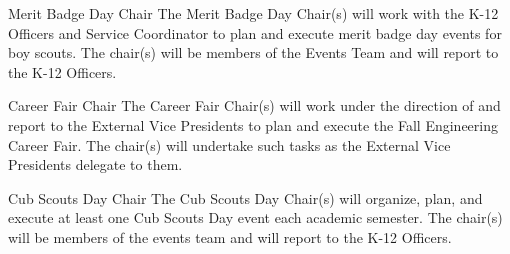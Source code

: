 \begin{enumsubsection}



\item{Merit Badge Day Chair}
The Merit Badge Day Chair(s) will work with the K-12 Officers and Service Coordinator to plan and execute merit badge day events for boy scouts.
The chair(s) will be members of the Events Team and will report to the K-12 Officers.


\item{Career Fair Chair}
The Career Fair Chair(s) will work under the direction of and report to the External Vice Presidents to plan and execute the Fall Engineering Career Fair.
The chair(s) will undertake such tasks as the External Vice Presidents delegate to them.

\item{Cub Scouts Day Chair}
The Cub Scouts Day Chair(s) will organize, plan, and execute at least one Cub Scouts Day event each academic semester.
The chair(s) will be members of the events team and will report to the K-12 Officers.


\end{enumsubsection}
